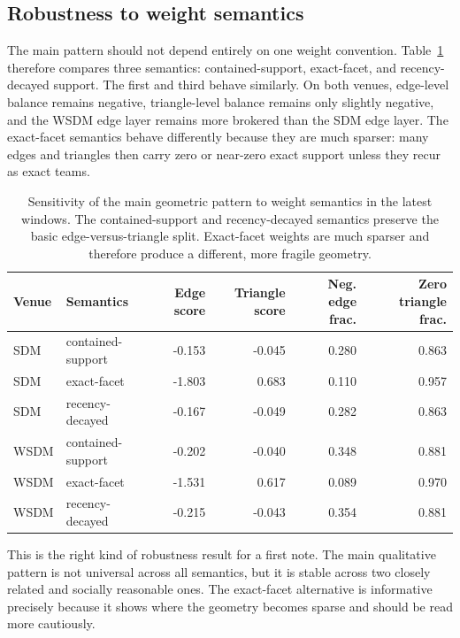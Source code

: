 \documentclass[11pt]{article}
\begin{document}
\subsection{Robustness to weight semantics}

The main pattern should not depend entirely on one weight convention. Table~\ref{tab:weights} therefore compares three semantics: contained-support, exact-facet, and recency-decayed support. The first and third behave similarly. On both venues, edge-level balance remains negative, triangle-level balance remains only slightly negative, and the WSDM edge layer remains more brokered than the SDM edge layer. The exact-facet semantics behave differently because they are much sparser: many edges and triangles then carry zero or near-zero exact support unless they recur as exact teams.

\begin{table}[ht]
\centering
\small
\begin{tabular}{llrrrr}
\toprule
Venue & Semantics & Edge score & Triangle score & Neg. edge frac. & Zero triangle frac. \\
\midrule
SDM & contained-support & -0.153 & -0.045 & 0.280 & 0.863 \\
SDM & exact-facet & -1.803 & 0.683 & 0.110 & 0.957 \\
SDM & recency-decayed & -0.167 & -0.049 & 0.282 & 0.863 \\
WSDM & contained-support & -0.202 & -0.040 & 0.348 & 0.881 \\
WSDM & exact-facet & -1.531 & 0.617 & 0.089 & 0.970 \\
WSDM & recency-decayed & -0.215 & -0.043 & 0.354 & 0.881 \\
\bottomrule
\end{tabular}
\caption{Sensitivity of the main geometric pattern to weight semantics in the latest windows. The contained-support and recency-decayed semantics preserve the basic edge-versus-triangle split. Exact-facet weights are much sparser and therefore produce a different, more fragile geometry.}
\label{tab:weights}
\end{table}

This is the right kind of robustness result for a first note. The main qualitative pattern is not universal across all semantics, but it is stable across two closely related and socially reasonable ones. The exact-facet alternative is informative precisely because it shows where the geometry becomes sparse and should be read more cautiously.
\end{document}
